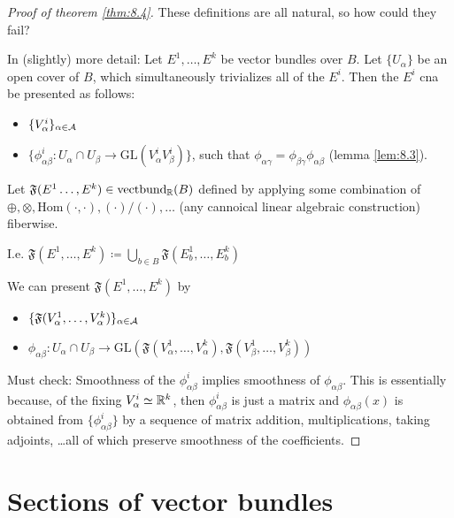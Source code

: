 \begin{proof}[Proof of theorem \ref{thm:8.4}]
    These definitions are all natural, so how could they fail? %

    In (slightly) more detail: Let \(E^1,\dots,E^k\) be vector bundles over \(B\).
    Let \(\{U_\alpha\}\) be an open cover of \(B\), which simultaneously trivializes all of the \(E^i\).
    Then the \(E^i\) cna be presented as follows: 
    \begin{itemize}
        \item \(\{V_\alpha^i\}_{\alpha\in\mathcal{A}}\)
        \item \(\{\phi_{\alpha\beta}^i:U_\alpha\cap U_\beta\to \text{GL}(V_\alpha^iV_\beta^i)\}\), such that \(\phi_{\alpha\gamma}=\phi_{\beta\gamma}\phi_{\alpha\beta}\) (lemma \ref{lem:8.3}).
    \end{itemize} 
    Let \(\mathfrak{F}(E^1\dots,E^k)\in\text{vectbund}_{\mathbb{R}}(B)\) defined by applying some combination of 
    \(\oplus,\otimes,\text{Hom}(\cdot,\cdot),(\cdot)/(\cdot),\dots\) (any cannoical linear algebraic construction) fiberwise.

    I.e. \(\mathfrak{F}(E^1,\dots,E^k)\coloneqq \bigcup_{b\in B}\mathfrak{F}(E_b^1,\dots,E_b^k)\)

    We can present \(\mathfrak{F}(E^1,\dots,E^k)\) by 
    \begin{itemize}
        \item \(\{\mathfrak{F}(V_\alpha^1,\dots,V_\alpha^k)\}_{\alpha\in \mathcal{A}}\)
        \item \(\phi_{\alpha\beta}:U_\alpha\cap U_\beta \to \text{GL}(\mathfrak{F}(V_\alpha^1,\dots,V_\alpha^k),\mathfrak{F}(V_\beta^1,\dots,V_\beta^k))\)
    \end{itemize}

    Must check: Smoothness of the \(\phi_{\alpha\beta}^i\) implies smoothness of \(\phi_{\alpha\beta}\). This 
    is essentially because, of the  fixing \(V_\alpha^i\simeq \mathbb{R}^k\), then \(\phi_{\alpha\beta}^i\) is just 
    a matrix and \(\phi_{\alpha\beta}(x)\) is obtained from \(\{\phi_{\alpha\beta}^i\}\) by a sequence of matrix addition, multiplications,
    taking adjoints, \dots all of which preserve smoothness of the coefficients. \qedhere

\end{proof}

\section{Sections of vector bundles}

